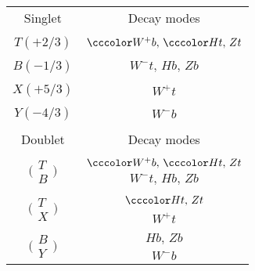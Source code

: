 \begin{tabular}{cc}\toprule
Singlet & Decay modes\\ 
& \\
$T(+2/3)$ & ${\cccolor W^+b},\, {\cccolor Ht},\, Zt$ \\
& \\
$B(-1/3)$ & $ W^-t,\, Hb,\, Zb$ \\
& \\
$X(+5/3)$ & $W^+t$\\
& \\
$Y(-4/3)$ & \cccolor$W^-b$ \\
& \\\midrule
Doublet & Decay modes\\
 &\\
 \multirow{2}{*}{$\bigg(\begin{array}{c}T \\ B\end{array}\bigg)$} & ${\cccolor W^+b},\, {\cccolor Ht},\, Zt$ \\
 & $ W^-t,\, Hb,\, Zb$\\
 & \\
\multirow{2}{*}{$\bigg(\begin{array}{c}T \\ X\end{array}\bigg)$} & ${\cccolor Ht},\, Zt$\\
 & $W^+t$\\
 &\\
 \multirow{2}{*}{$\bigg(\begin{array}{c}B \\ Y\end{array}\bigg)$} & $Hb,\, Zb$\\
 & \cccolor$W^-b$\\
\bottomrule
\end{tabular}
